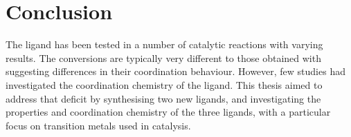 
\chapter{Conclusion}
\label{ch:conclusion}


The \tBuxantphos{} ligand has been tested in a number of catalytic reactions with varying results.  The conversions are typically very different to those obtained with \Phxantphos{} suggesting differences in their coordination behaviour.  However, few studies had investigated the coordination chemistry of the \tBuxantphos{} ligand.  This thesis aimed to address that deficit by synthesising two new \tBuxantphos{} ligands, and investigating the properties and coordination chemistry of the three ligands, with a particular focus on transition metals used in catalysis.  


